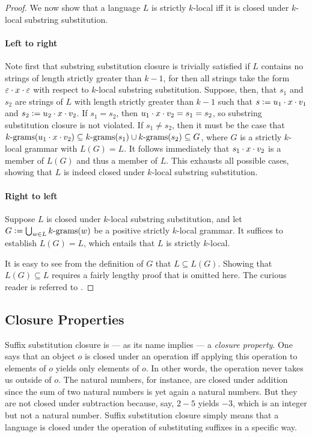 \begin{proof}
    We now show that a language $L$ is strictly $k$-local iff it is closed under $k$-local substring substitution.
    
    \paragraph{Left to right}
    Note first that substring substitution closure is trivially satisfied if $L$ contains no strings of length strictly greater than $k-1$, for then all strings take the form $\emptystring \stringcat x \stringcat \emptystring$ with respect to $k$-local substring substitution.
    Suppose, then, that $s_1$ and $s_2$ are strings of $L$ with length strictly greater than $k-1$ such that $s \is u_1 \stringcat x \stringcat v_1$ and $s_2 \is u_2 \stringcat x \stringcat v_2$.
    If $s_1 = s_2$, then $u_1 \stringcat x \stringcat v_2 = s_1 = s_2$, so substring substitution closure is not violated.
    If $s_1 \neq s_2$, then it must be the case that $\Bigrams[k](u_1 \stringcat x \stringcat v_2) \subseteq \Bigrams[k](s_1) \cup \Bigrams[k](s_2) \subseteq G$, where $G$ is a strictly $k$-local grammar with $L(G) = L$.
    It follows immediately that $s_1 \stringcat x \stringcat v_2$ is a member of $L(G)$ and thus a member of $L$. 
    This exhausts all possible cases, showing that $L$ is indeed closed under $k$-local substring substitution.

    \paragraph{Right to left}
    Suppose $L$ is closed under $k$-local substring substitution, and let $G \is \bigcup_{w \in L} \Bigrams[k](w)$ be a positive strictly $k$-local grammar.
    It suffices to establish $L(G) = L$, which entails that $L$ is strictly $k$-local.

    It is easy to see from the definition of $G$ that $L \subseteq L(G)$.
    Showing that $L(G) \subseteq L$ requires a fairly lengthy proof that is omitted here.
    The curious reader is referred to \citet[19--21]{Rogers07}.
\end{proof}

\subsection{Closure Properties}

Suffix substitution closure is --- as its name implies --- a \emph{closure property}.
One says that an object $o$ is closed under an operation iff applying this operation to elements of $o$ yields only elements of $o$.
In other words, the operation never takes us outside of $o$.
The natural numbers, for instance, are closed under addition since the sum of two natural numbers is yet again a natural numbers.
But they are not closed under subtraction because, say, $2-5$ yields $-3$, which is an integer but not a natural number.
Suffix substitution closure simply means that a language is closed under the operation of substituting suffixes in a specific way.

